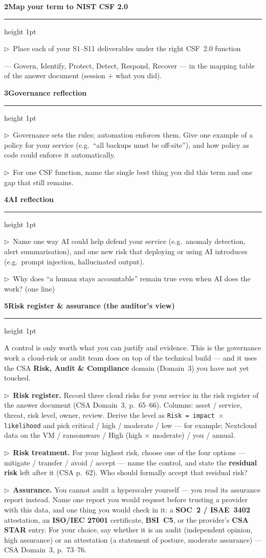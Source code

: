\documentclass[11pt]{article}
\newcommand{\wbsection}[1]{\par\vspace{11pt}\noindent
  {\large\bfseries\color{kred}#1}\par\vspace{2pt}
  {\color{kred!35}\hrule height 1pt}\par\vspace{6pt}}
\newcommand{\task}[1]{\par\vspace{4pt}\noindent
  \textcolor{kred}{\textbf{$\triangleright$}}~#1\par\vspace{2pt}}
\renewcommand{\emph}[1]{\textup{#1}}
\newcommand{\cmd}[1]{\texttt{#1}}
\begin{document}
\wbsection{2\quad Map your term to NIST CSF 2.0}
\task{Place each of your S1--S11 deliverables under the right CSF~2.0 function} --- Govern, Identify,
Protect, Detect, Respond, Recover --- in the mapping table of the answer document (session + what you did).

\wbsection{3\quad Governance reflection}
\task{Governance sets the rules; automation enforces them. Give one example of a \emph{policy} for your
service (e.g.\ ``all backups must be off-site''), and how \emph{policy as code} could enforce it
automatically.}
\task{For one CSF function, name the single best thing you did this term and one gap that still remains.}

\wbsection{4\quad AI reflection}
\task{Name one way AI could help \emph{defend} your service (e.g.\ anomaly detection, alert
summarisation), and one new \emph{risk} that deploying or using AI introduces (e.g.\ prompt injection,
hallucinated output).}
\task{Why does ``a human stays accountable'' remain true even when AI does the work? (one line)}

\wbsection{5\quad Risk register \& assurance (the auditor's view)}
A control is only worth what you can \emph{justify} and \emph{evidence}. This is the governance work a
cloud-risk or audit team does on top of the technical build --- and it uses the CSA \textbf{Risk, Audit \&
Compliance} domain (Domain~3) you have not yet touched.

\task{\textbf{Risk register.} Record three cloud risks for your service in the risk register of the answer
document (CSA Domain~3, p.~65--66). Columns: asset / service, threat, risk level, owner, review. Derive
the level as \cmd{Risk = impact $\times$ likelihood} and pick critical / high / moderate / low --- for
example: Nextcloud data on the VM / ransomware / High (high $\times$ moderate) / you / annual.}

\task{\textbf{Risk treatment.} For your highest risk, choose one of the four options ---
\emph{mitigate / transfer / avoid / accept} --- name the control, and state the \textbf{residual risk}
left after it (CSA p.~62). Who should formally \emph{accept} that residual risk?}

\task{\textbf{Assurance.} You cannot audit a hyperscaler yourself --- you read its assurance report
instead. Name one report you would request before trusting a provider with this data, and one thing you
would check in it: a \textbf{SOC~2 / ISAE~3402} attestation, an \textbf{ISO/IEC 27001} certificate,
\textbf{BSI~C5}, or the provider's \textbf{CSA STAR} entry. For your choice, say whether it is an
\emph{audit} (independent opinion, high assurance) or an \emph{attestation} (a statement of posture,
moderate assurance) --- CSA Domain~3, p.~73--76.}
\end{document}
